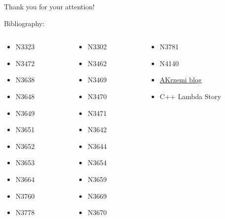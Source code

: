 \documentclass[10pt]{beamer}
\begin{document}
\begin{frame}{Thank you for your attention!}

\vfill Bibliography:
\small

\begin{columns}[T]
	\begin{column}{0.28\linewidth}	
\begin{itemize}
	\item N3323
	\item N3472
	\item N3638
	\item N3648
	\item N3649
	\item N3651
	\item N3652
	\item N3653
	\item N3664
	\item N3760
	\item N3778
\end{itemize}
	\end{column}

	\begin{column}{0.28\linewidth}
	\begin{itemize}
	\item N3302
	\item N3462
	\item N3469
	\item N3470
	\item N3471
	\item N3642
	\item N3644
	\item N3654
	\item N3659
	\item N3669
	\item N3670
	\end{itemize}
	\end{column}

\begin{column}{0.28\linewidth}
 \begin{itemize}
 	\item N3781
 	\item N4140
 	\item \href{https://akrzemi1.wordpress.com/}{AKrzemi blog}
 	\item C++ Lambda Story
 \end{itemize}
\end{column}

\end{columns}
\end{frame}
\end{document}
